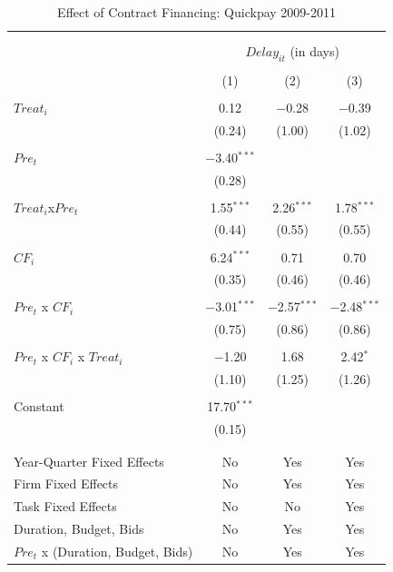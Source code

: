 \documentclass[
]{article}
\begin{document}
\begin{table}[H] \centering 
  \caption{Effect of Contract Financing: Quickpay 2009-2011} 
  \label{} 
\small 
\begin{tabular}{@{\extracolsep{-2pt}}lccc} 
\\[-1.8ex]\hline 
\hline \\[-1.8ex] 
\\[-1.8ex] & \multicolumn{3}{c}{$Delay_{it}$ (in days)} \\ 
\\[-1.8ex] & (1) & (2) & (3)\\ 
\hline \\[-1.8ex] 
 $Treat_i$ & 0.12 & $-$0.28 & $-$0.39 \\ 
  & (0.24) & (1.00) & (1.02) \\ 
  & & & \\ 
 $Pre_t$ & $-$3.40$^{***}$ &  &  \\ 
  & (0.28) &  &  \\ 
  & & & \\ 
 $Treat_i$x$Pre_t$ & 1.55$^{***}$ & 2.26$^{***}$ & 1.78$^{***}$ \\ 
  & (0.44) & (0.55) & (0.55) \\ 
  & & & \\ 
 $CF_i$ & 6.24$^{***}$ & 0.71 & 0.70 \\ 
  & (0.35) & (0.46) & (0.46) \\ 
  & & & \\ 
 $Pre_t$ x $CF_i$ & $-$3.01$^{***}$ & $-$2.57$^{***}$ & $-$2.48$^{***}$ \\ 
  & (0.75) & (0.86) & (0.86) \\ 
  & & & \\ 
 $Pre_t$ x $CF_i$ x $Treat_i$ & $-$1.20 & 1.68 & 2.42$^{*}$ \\ 
  & (1.10) & (1.25) & (1.26) \\ 
  & & & \\ 
 Constant & 17.70$^{***}$ &  &  \\ 
  & (0.15) &  &  \\ 
  & & & \\ 
\hline \\[-1.8ex] 
Year-Quarter Fixed Effects & No & Yes & Yes \\ 
Firm Fixed Effects & No & Yes & Yes \\ 
Task Fixed Effects & No & No & Yes \\ 
Duration, Budget, Bids & No & Yes & Yes \\ 
$Pre_t$  x  (Duration, Budget, Bids) & No & Yes & Yes \\ 

\end{tabular}
\end{table}
\end{document}
